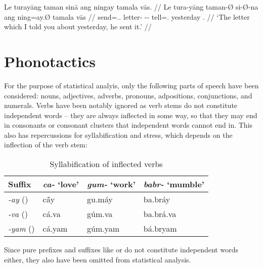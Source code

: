 \ex\begingl
	\gla Le turayāng taman sinā ang ningay tamala vās. //
	\glb Le tura-yāng taman-Ø si-Ø-na ang ning=ay.Ø tamala vās //
	\glc \PatTI{} send=\Tsg{}.\M{}.\Aarg{} letter-\Top{} \Rel{}-\PatTI{}-\Gen{} \AgtT{} tell=\Fsg{}.\Top{} yesterday \Ssg{}.\Parg{} //
	\glft `The letter which I told you about yesterday, he sent it.' //
\endgl\xe

\section{Phonotactics}

For the purpose of statistical analyis, only the following parts of speech have 
been considered: nouns, adjectives, adverbs, pronouns, adpositions, 
conjunctions, and numerals. Verbs have been notably ignored as verb stems do 
not constitute independent words -- they are always inflected in some way, so 
that they may end in consonants or consonant clusters that independent words 
cannot end in. This also has repercussions for syllabification and stress, 
which depends on the inflection of the verb stem:

\begin{table}[h]
\label{ex:verbsyll}
\caption{Syllabification of inflected verbs}
\begin{tabu} to \linewidth {X[2l] X[3c] X[3c] X[3c]}
\toprule\tableheaderfont
Suffix
	& \emph{ca-} `love'
	& \emph{gum-} `work'
	& \emph{babr-} `mumble'
	\\

\toprule

\emph{-ay} (\Fsg{})
	& cā́y
	& gu.máy
	& ba.bráy
	\\

\emph{-va} (\Ssg{})
	& cá.va
	& gúm.va
	& ba.brá.va
	\\

\emph{-yam} (\Ptcp{})
	& cá.yam
	& gúm.yam
	& bá.bryam
	\\

\bottomrule
\end{tabu}
\end{table}

Since pure prefixes and suffixes like  or 
 do not constitute independent words either, 
they also have been omitted from statistical analysis.
